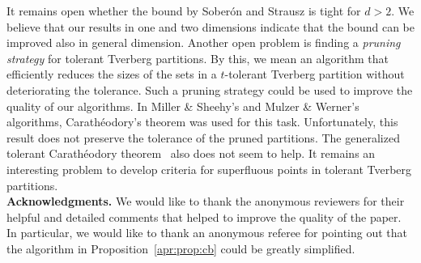 \documentclass[oribibl,envcountsame,envcountsect]{llncs}
\newcommand{\Soberon}{Sober\'{o}n}
\newcommand{\Caratheodory}{Carath\'{e}odory}
\begin{document}
It remains open whether the bound by \Soberon{} and Strausz is tight for $d > 2$.
We believe that our results in one and two dimensions indicate that
the bound can be improved also in general dimension.
Another open problem is finding a \emph{pruning strategy} for tolerant
Tverberg partitions. By this, we mean an
algorithm that efficiently reduces the sizes of the sets in a $t$-tolerant Tverberg
partition without deteriorating the tolerance.
Such a pruning strategy could be used to improve the quality of our algorithms.
In Miller \& Sheehy's and Mulzer \& Werner's algorithms,
\Caratheodory{}'s theorem was used for this task. Unfortunately, this result does not
preserve the tolerance of the pruned partitions. The generalized tolerant
\Caratheodory{} theorem~\cite{Montejano2011} also does not seem to help. It remains an
interesting problem to develop criteria for superfluous points
in tolerant Tverberg partitions.
\\

\noindent\textbf{Acknowledgments.}
We would like to thank the anonymous reviewers for their helpful
and detailed comments that helped to improve the quality of the
paper. In particular, we would like to thank an anonymous referee
for pointing out that the algorithm in
Proposition~\ref{apr:prop:cb} could be greatly simplified.




\end{document}
